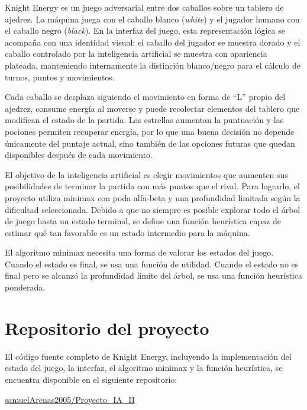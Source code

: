 \documentclass[12pt,letterpaper]{article}
\begin{document}
Knight Energy es un juego adversarial entre dos caballos sobre un tablero de ajedrez. La máquina juega con el caballo blanco (\textit{white}) y el jugador humano con el caballo negro (\textit{black}). En la interfaz del juego, esta representación lógica se acompaña con una identidad visual: el caballo del jugador se muestra dorado y el caballo controlado por la inteligencia artificial se muestra con apariencia plateada, manteniendo internamente la distinción blanco/negro para el cálculo de turnos, puntos y movimientos.

Cada caballo se desplaza siguiendo el movimiento en forma de ``L'' propio del ajedrez, consume energía al moverse y puede recolectar elementos del tablero que modifican el estado de la partida. Las estrellas aumentan la puntuación y las pociones permiten recuperar energía, por lo que una buena decisión no depende únicamente del puntaje actual, sino también de las opciones futuras que quedan disponibles después de cada movimiento.

El objetivo de la inteligencia artificial es elegir movimientos que aumenten sus posibilidades de terminar la partida con más puntos que el rival. Para lograrlo, el proyecto utiliza minimax con poda alfa-beta y una profundidad limitada según la dificultad seleccionada. Debido a que no siempre es posible explorar todo el árbol de juego hasta un estado terminal, se define una función heurística capaz de estimar qué tan favorable es un estado intermedio para la máquina.

\begin{tcolorbox}[colframe=KEGold,title=\textbf{Idea central},coltitle=KEDark,colbacktitle=KEGold!35]
El algoritmo minimax necesita una forma de valorar los estados del juego. Cuando el estado es final, se usa una función de utilidad. Cuando el estado no es final pero se alcanzó la profundidad límite del árbol, se usa una función heurística ponderada.
\end{tcolorbox}

\section{Repositorio del proyecto}

El código fuente completo de Knight Energy, incluyendo la implementación del estado del juego, la interfaz, el algoritmo minimax y la función heurística, se encuentra disponible en el siguiente repositorio:

\begin{center}
\href{https://github.com/samuelArenas2005/Proyecto_IA_II}{samuelArenas2005/Proyecto\_IA\_II}
\end{center}
\end{document}
